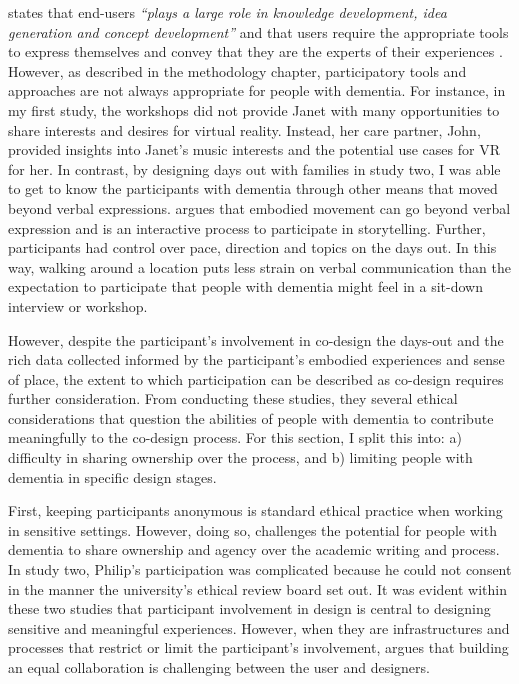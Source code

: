 \cite{sanders2008co} states that end-users \textit{``plays a large role in knowledge development, idea generation and concept development''} and that users require the appropriate tools to express themselves and convey that they are the experts of their experiences \citep{visser2005contextmapping}. However, as described in the methodology chapter, participatory tools and approaches are not always appropriate for people with dementia. For instance, in my first study, the workshops did not provide Janet with many opportunities to share interests and desires for virtual reality. Instead, her care partner, John, provided insights into Janet's music interests and the potential use cases for VR for her. In contrast, by designing days out with families in study two, I was able to get to know the participants with dementia through other means that moved beyond verbal expressions. \cite{hyden2013storytelling} argues that embodied movement can go beyond verbal expression and is an interactive process to participate in storytelling. Further, participants had control over pace, direction and topics on the days out. In this way, walking around a location puts less strain on verbal communication than the expectation to participate that people with dementia might feel in a sit-down interview or workshop. 

However, despite the participant's involvement in co-design the days-out and the rich data collected informed by the participant's embodied experiences and sense of place, the extent to which participation can be described as co-design requires further consideration. From conducting these studies, they several ethical considerations that question the abilities of people with dementia to contribute meaningfully to the co-design process. For this section, I split this into: a)  difficulty in sharing ownership over the process, and b) limiting people with dementia in specific design stages.

First, keeping participants anonymous is standard ethical practice when working in sensitive settings. However, doing so, challenges the potential for people with dementia to share ownership and agency over the academic writing and process. In study two, Philip's participation was complicated because he could not consent in the manner the university's ethical review board set out. It was evident within these two studies that participant involvement in design is central to designing sensitive and meaningful experiences. However, when they are infrastructures and processes that restrict or limit the participant's involvement, \cite{hendriks_challenges_2014} argues that building an equal collaboration is challenging between the user and designers.

